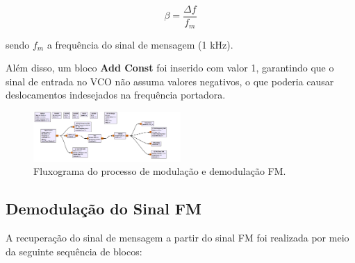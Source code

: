 \begin{equation}
\beta = \frac{\Delta f}{f_m}
\end{equation}

\noindent
sendo $f_m$ a frequência do sinal de mensagem (1 kHz).

Além disso, um bloco \textbf{Add Const} foi inserido com valor 1, garantindo que o sinal de entrada no VCO não assuma valores negativos, o que poderia causar deslocamentos indesejados na frequência portadora.

\begin{figure}[!h]
    \centering
    \includegraphics[width=0.5\textwidth]{images/FM_FLUXOGRAMA.png}
    \caption{Fluxograma do processo de modulação e demodulação FM.}
    \label{fig:fluxograma}
\end{figure}

\subsection{Demodulação do Sinal FM}

A recuperação do sinal de mensagem a partir do sinal FM foi realizada por meio da seguinte sequência de blocos:

